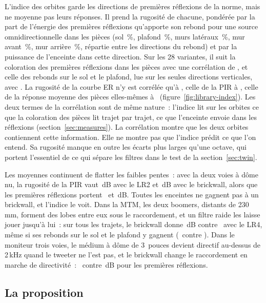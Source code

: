 \documentclass[11pt,a4paper]{article}
\begin{document}
L'indice des orbites garde les directions de premières réflexions de la norme, mais ne moyenne pas leurs
réponses. Il prend la rugosité de chacune, pondérée par la part de l'énergie des premières réflexions
qu'apporte son rebond pour une source omnidirectionnelle dans les pièces (sol \nlibShareFloor\,\%, plafond
\nlibShareCeiling\,\%, murs latéraux \nlibShareSide\,\%, mur avant \nlibShareFront\,\%, mur arrière
\nlibShareRear\,\%, répartie entre les directions du rebond) et par la puissance de l'enceinte dans cette
direction. Sur les 28 variantes, il suit la coloration des premières réflexions dans les pièces avec une
corrélation de \nlibCorrIndex, et celle des rebonds sur le sol et le plafond, lue sur les seules directions
verticales, avec \nlibCorrIndexVert. La rugosité de la courbe ER n'y est corrélée qu'à \nlibCorrEr, celle de
la PIR à \nlibCorrPir, celle de la réponse moyenne des pièces elles-mêmes à \nlibCorrRoom\
(figure~\ref{fig:library-index}). Les deux termes de la corrélation sont de même nature~: l'indice lit sur
les orbites ce que la coloration des pièces lit trajet par trajet, ce que l'enceinte envoie dans les
réflexions (section~\ref{sec:measures}). La corrélation montre que les deux orbites contiennent cette
information. Elle ne montre pas que l'indice prédit ce que l'on entend. Sa rugosité manque en outre les
écarts plus larges qu'une octave, qui portent l'essentiel de ce qui sépare les filtres dans le test de la
section~\ref{sec:twin}.

Les moyennes continuent de flatter les faibles pentes~: avec la deux voies à dôme nu, la rugosité de la
PIR vaut \nlibDomeLrTwoPir\,dB avec le LR2 et \nlibDomeFirPir\,dB avec le brickwall, alors que les premières
réflexions portent \nlibDomeLrTwoRefl\ et \nlibDomeFirRefl\,dB. Toutes les enceintes ne gagnent pas à un
brickwall, et l'indice le voit. Dans la MTM, les deux boomers, distants de 230\,mm, forment des lobes entre
eux sous le raccordement, et un filtre raide les laisse jouer jusqu'à lui~: sur tous les trajets, le
brickwall donne \nlibMtmFirAll\,dB contre \nlibMtmLrFourAll\ avec le LR4, même si ses rebonds sur le sol et le
plafond y gagnent (\nlibMtmFirVert\ contre \nlibMtmLrFourVert). Dans le moniteur trois voies, le médium à dôme
de 3~pouces devient directif au-dessus de 2\,kHz quand le tweeter ne l'est pas, et le brickwall change le
raccordement en marche de directivité~: \nlibMonitorFirRefl\ contre \nlibMonitorLrFourRefl\,dB pour les
premières réflexions.

\subsection{La proposition}
\end{document}
